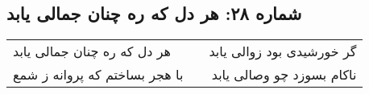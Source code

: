 \begin{center}
\section*{شماره ۲۸: هر دل که ره چنان جمالی یابد}
\label{sec:028}
\begin{longtable}{l p{0.5cm} r}
هر دل که ره چنان جمالی یابد
&&
گر خورشیدی بود زوالی یابد
\\
با هجر بساختم که پروانه ز شمع
&&
ناکام بسوزد چو وصالی یابد
\\
\end{longtable}
\end{center}
